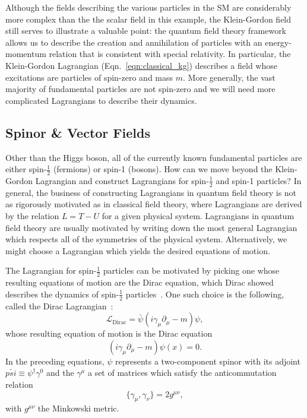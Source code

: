 Although the fields describing the various particles in the SM are considerably more complex than the the scalar field in this example, the Klein-Gordon field still serves to illustrate a valuable point: the quantum field theory framework allows us to describe the creation and annihilation of particles with an energy-momentum relation that is consistent with special relativity.
In particular, the Klein-Gordon Lagrangian (Eqn.~\ref{eqn:classical_kg}) describes a field whose excitations are particles of spin-zero and mass $m$.
More generally, the vast majority of fundamental particles are not spin-zero and we will need more complicated Lagrangians to describe their dynamics.

\subsection{Spinor \& Vector Fields}
Other than the Higgs boson, all of the currently known fundamental particles are either spin-$\frac{1}{2}$ (fermions) or spin-1 (bosons).
How can we move beyond the Klein-Gordon Lagrangian and construct Lagrangians for spin-$\frac{1}{2}$ and spin-1 particles?
In general, the business of constructing Lagrangians in quantum field theory is not as rigorously motivated as in classical field theory, where Lagrangians are derived by the relation $L = T - U$ for a given physical system.
Lagrangians in quantum field theory are usually motivated by writing down the most general Lagrangian which respects all of the symmetries of the physical system.
Alternatively, we might choose a Lagrangian which yields the desired equations of motion.

The Lagrangian for spin-$\frac{1}{2}$ particles can be motivated by picking one whose resulting equations of motion are the Dirac equation, which Dirac showed describes the dynamics of spin-$\frac{1}{2}$ particles~\cite{Dirac:1928hu}.
One such choice is the following, called the Dirac Lagrangian~\cite{Peskin:1995ev}:
\begin{equation}
    \mathcal L_{\text{Dirac}} = \bar{\psi}(i \gamma_\mu \partial_\mu - m) \psi,
\end{equation}
whose resulting equation of motion is the Dirac equation
\begin{equation}
    (i \gamma_\mu \partial_\mu - m) \psi(x) = 0.
\end{equation}
In the preceding equations, $\psi$ represents a two-component spinor with its adjoint $\bar{psi} \equiv \psi^\dagger\gamma^0$ and the $\gamma^\mu$ a set of matrices which satisfy the anticommutation relation
\begin{equation}
    \{\gamma_\mu, \gamma_\nu\} = 2 g^{\mu\nu},
\end{equation}
with $g^{\mu\nu}$ the Minkowski metric. 

